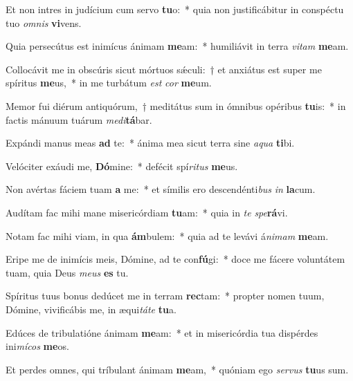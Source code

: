 \item Et non intres in judícium cum servo \textbf{tu}o:~* quia non justificábitur in conspéctu tuo \textit{om}\textit{nis} \textbf{vi}vens.
\item Quia persecútus est inimícus ánimam \textbf{me}am:~* humiliávit in terra \textit{vi}\textit{tam} \textbf{me}am.
\item Collocávit me in obscúris sicut mórtuos sǽculi:~† et anxiátus est super me spíritus \textbf{me}us,~* in me turbátum \textit{est} \textit{cor} \textbf{me}um.
\item Memor fui diérum antiquórum,~† meditátus sum in ómnibus opéribus \textbf{tu}is:~* in factis mánuum tuárum \textit{me}\textit{di}\textbf{tá}bar.
\item Expándi manus meas \textbf{ad} te:~* ánima mea sicut terra sine \textit{a}\textit{qua} \textbf{ti}bi.
\item Velóciter exáudi me, \textbf{Dó}mine:~* defécit spí\textit{ri}\textit{tus} \textbf{me}us.
\item Non avértas fáciem tuam \textbf{a} me:~* et símilis ero descendénti\textit{bus} \textit{in} \textbf{la}cum.
\item Audítam fac mihi mane misericórdiam \textbf{tu}am:~* quia in \textit{te} \textit{spe}\textbf{rá}vi.
\item Notam fac mihi viam, in qua \textbf{ám}bulem:~* quia ad te levávi á\textit{ni}\textit{mam} \textbf{me}am.
\item Eripe me de inimícis meis, Dómine, ad te con\textbf{fú}gi:~* doce me fácere voluntátem tuam, quia Deus \textit{me}\textit{us} \textbf{es} tu.
\item Spíritus tuus bonus dedúcet me in terram \textbf{rec}tam:~* propter nomen tuum, Dómine, vivificábis me, in æqui\textit{tá}\textit{te} \textbf{tu}a.
\item Edúces de tribulatióne ánimam \textbf{me}am:~* et in misericórdia tua dispérdes ini\textit{mí}\textit{cos} \textbf{me}os.
\item Et perdes omnes, qui tríbulant ánimam \textbf{me}am,~* quóniam ego \textit{ser}\textit{vus} \textbf{tu}us sum.
